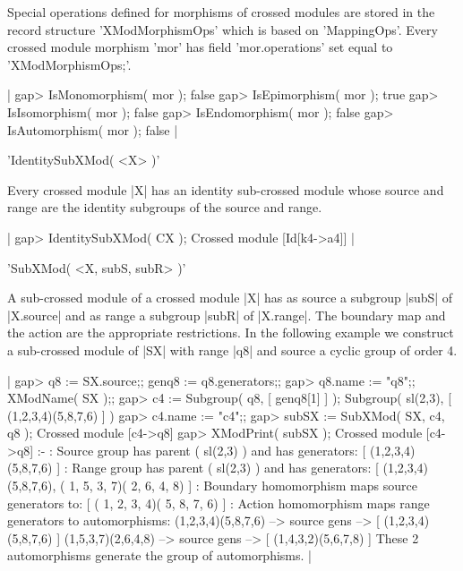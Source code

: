 Special operations defined for morphisms of crossed modules are stored in 
the record structure 'XModMorphismOps' which is based on 'MappingOps'.
Every crossed module morphism 'mor' has field 'mor.operations' 
set equal to 'XModMorphismOps;'.

|    gap> IsMonomorphism( mor );
    false
    gap> IsEpimorphism( mor );
    true
    gap> IsIsomorphism( mor );
    false
    gap> IsEndomorphism( mor );
    false
    gap> IsAutomorphism( mor );
    false   |

%

'IdentitySubXMod( <X> )'

Every crossed module |X| has an identity sub-crossed module
whose source and range are the identity subgroups of the source and range.

|    gap> IdentitySubXMod( CX );
    Crossed module [Id[k4->a4]]  |

%

'SubXMod( <X, subS, subR> )'

A sub-crossed module of a crossed module |X| has as source
a subgroup |subS| of |X.source| and as range a subgroup |subR| of |X.range|.
The boundary map and the action are the appropriate restrictions.
In the following example we construct a sub-crossed module
of |SX| with range |q8| and source a cyclic group of order 4.

|    gap> q8 := SX.source;; genq8 := q8.generators;;
    gap> q8.name := "q8";; XModName( SX );;
    gap> c4 := Subgroup( q8, [ genq8[1] ] );
    Subgroup( sl(2,3), [ (1,2,3,4)(5,8,7,6) ] )
    gap> c4.name := "c4";;
    gap> subSX := SubXMod( SX, c4, q8 );
    Crossed module [c4->q8] 
    gap> XModPrint( subSX );
    Crossed module [c4->q8] :- 
    : Source group has parent ( sl(2,3) ) and has generators:
      [ (1,2,3,4)(5,8,7,6) ]
    : Range group has parent ( sl(2,3) ) and has generators:
      [ (1,2,3,4)(5,8,7,6), ( 1, 5, 3, 7)( 2, 6, 4, 8) ]
    : Boundary homomorphism maps source generators to:
      [ ( 1, 2, 3, 4)( 5, 8, 7, 6) ]
    : Action homomorphism maps range generators to automorphisms:
      (1,2,3,4)(5,8,7,6) --> {source gens --> [ (1,2,3,4)(5,8,7,6) ]}
      (1,5,3,7)(2,6,4,8) --> {source gens --> [ (1,4,3,2)(5,6,7,8) ]}
      These 2 automorphisms generate the group of automorphisms.  |

%

